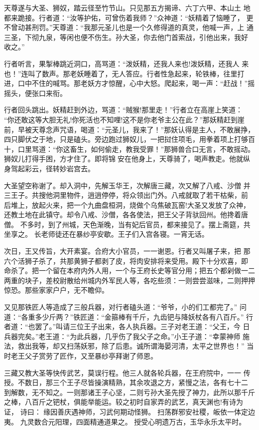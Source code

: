 天尊遂与大圣、狮奴，踏云径至竹节山。只见那五方揭谛、六丁六甲、本山土
地都来跪接。行者道：“汝等护佑，可曾伤着我师？”众神道：“妖精着了恼睡了，
更不曾动甚刑罚。”天尊道：“我那元圣儿也是一个久修得道的真灵，他喊一声，上
通三圣，下彻九泉，等闲也便不伤生。孙大圣，你去他门首索战，引他出来，我好
收之。”

行者听言，果掣棒跳近洞口，高骂道：“泼妖精，还我人来也!泼妖精，还我人
来也！”连叫了数声。那老妖睡着了，无人答应。行者性急起来，轮铁棒，往里打
进，口中不住的喊骂。那老妖方才惊醒，心中大怒。爬起来，喝一声：“赶战！”摇
摇头，便张口来衔。

行者回头跳出。妖精赶到外边，骂道：“贼猴!那里走！”行者立在高崖上笑道：
“你还敢这等大胆无礼!你死活也不知哩!这不是你老爷主公在此？”那妖精赶到崖
前，早被天尊念声咒语，喝道：“元圣儿，我来了！”那妖认得是主人，不敢展挣，
四只脚伏之于地，只是磕头。旁边跑过狮奴儿，一把挝住项毛，用拳着项上打够百
十，口里骂道：“你这畜生，如何偷走，教我受罪！”那狮兽合口无言，不敢摇动。
狮奴儿打得手困，方才住了。即将锦安在他身上，天尊骑了，喝声教走。他就纵
身驾起彩云，径转妙岩宫去。

大圣望空称谢了。却入洞中，先解玉华王，次解唐三藏，次又解了八戒、沙僧
并三王子。共搜他洞里物件，逍逍停停，将众领出门外。八戒就取了若干枯柴，前
后堆上，放起火来，把一个九曲盘桓洞，烧做个乌焦破瓦窑!大圣又发放了众神，
还教土地在此镇守。却令八戒、沙僧，各各使法，把王父子背驮回州。他搀着唐僧。
不多时，到了州城，天色渐晚，当有妃后官员，都来接见了。摆上斋筵，共坐享之。
长老师徒还在暴纱亭安歇。王子们入宫各寝。一宵无话。

次日，王又传旨，大开素宴。合府大小官员，一一谢恩。行者又叫屠子来，把
那六个活狮子杀了，共那黄狮子都剥了皮，将肉安排将来受用。殿下十分欢喜，即
命杀了。把一个留在本府内外人用，一个与王府长史等官分用；把五个都剁做一二
两重的块子，差校尉散给州城内外军民人等，各吃些须：一则尝尝滋味，二则押押
惊恐。那些家家户户，无不瞻仰。

又见那铁匠人等造成了三般兵器，对行者磕头道：“爷爷，小的们工都完了。”
问道：“各重多少斤两？”铁匠道：“金箍棒有千斤，九齿钯与降妖杖各有八百斤。”
行者道：“也罢了。”叫请三位王子出来，各人执兵器。三子对老王道：“父王，今
日兵器完矣。”老王道：“为此兵器，几乎伤了我父子之命。”小王子道：“幸蒙神师
施法，救出我等，却又扫荡妖邪，除了后患。诚所谓海晏河清，太平之世界也！”
当时老王父子赏劳了匠作，又至暴纱亭拜谢了师恩。

三藏又教大圣等快传武艺，莫误行程。他三人就各轮兵器，在王府院中，一一
传授。不数日，那三个王子尽皆操演精熟，其余攻退之方，紧慢之法，各有七十二
到解数，无不知之。一则那诸王子心坚，二则亏孙大圣先授了神力，此所以那千斤
之棒，八百斤之钯杖，俱能举能运。较之初时自家弄的武艺，真天渊也!有诗为证，
诗曰：
缘因善庆遇神师，习武何期动怪狮。
扫荡群邪安社稷，皈依一体定边夷。
九灵数合元阳理，四面精通道果之。
授受心明遗万古，玉华永乐太平时。

